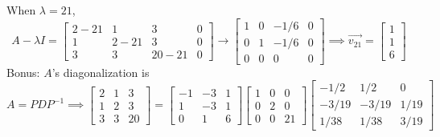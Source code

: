 When $\lambda = 21$,
\begin{equation*}
	A-\lambda I = \left[
		\begin{array}{ccc|c}
		2-21 & 1 & 3 & 0 \\
		1 & 2-21 & 3 & 0 \\
		3 & 3 & 20-21 & 0
		\end{array} 
	\right] \to \left[
		\begin{array}{ccc|c}
		1 & 0 & -1/6 & 0 \\
		0 & 1 & -1/6 & 0 \\
		0 & 0 & 0 & 0
		\end{array}
	\right] \implies \vec{v_{21}} = \begin{bmatrix}
		1 \\
		1 \\
		6
	\end{bmatrix}
\end{equation*}
Bonus: $A$'s diagonalization is
\begin{equation*}
	A = PDP^{-1} \implies \begin{bmatrix}
	2 & 1 & 3 \\
	1 & 2 & 3 \\
	3 & 3 & 20
	\end{bmatrix} = \begin{bmatrix}
	-1 & -3 & 1 \\
	1 & -3 & 1 \\
	0 & 1 & 6
	\end{bmatrix} \begin{bmatrix}
	1 & 0 & 0 \\
	0 & 2 & 0 \\
	0 & 0 & 21
	\end{bmatrix} \begin{bmatrix}
		-1/2 & 1/2 & 0 \\
		-3/19 & -3/19 & 1/19 \\
		1/38 & 1/38 & 3/19
	\end{bmatrix}
\end{equation*}